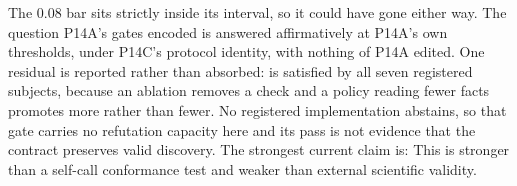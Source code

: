 {}The 0.08 bar sits strictly inside its interval, so it could have gone either way. The question P14A's gates encoded is answered affirmatively at P14A's own thresholds, under P14C's protocol identity, with nothing of P14A edited.\markdownRendererInterblockSeparator
{}One residual is reported rather than absorbed:  is satisfied by all seven registered subjects, because an ablation removes a check and a policy reading fewer facts promotes more rather than fewer. No registered implementation abstains, so that gate carries no refutation capacity here and its pass is not evidence that the contract preserves valid discovery.\markdownRendererInterblockSeparator
{}The strongest current claim is:  This is stronger than a self-call conformance test and weaker than external scientific validity.
\markdownRendererSectionEnd 
\markdownRendererSectionEnd \markdownRendererDocumentEnd